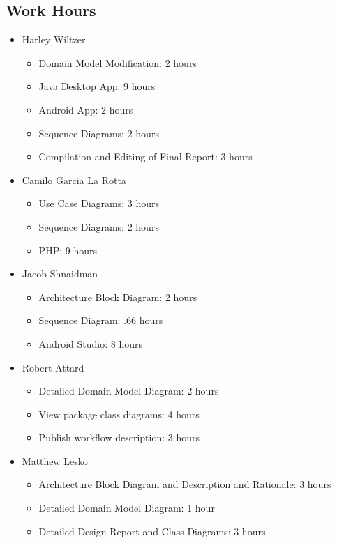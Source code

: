 \documentclass[12pt]{article}
\begin{document}
\subsection{Work Hours}

\begin{itemize}
    \item Harley Wiltzer
        \begin{itemize}
            \item Domain Model Modification: 2 hours
            \item Java Desktop App: 9 hours
            \item Android App: 2 hours
            \item Sequence Diagrams: 2 hours
            \item Compilation and Editing of Final Report: 3 hours
        \end{itemize}
    \item Camilo Garcia La Rotta
    \begin{itemize}
        \item Use Case Diagrams: 3 hours
        \item Sequence Diagrams: 2 hours
        \item PHP: 9 hours
    \end{itemize}
    \item Jacob Shnaidman
    \begin{itemize}
        \item Architecture Block Diagram: 2 hours
        \item Sequence Diagram: .66 hours
        \item Android Studio: 8 hours
    \end{itemize}
    \item Robert Attard
    \begin{itemize}
        \item Detailed Domain Model Diagram: 2 hours
        \item View package class diagrams: 4 hours
        \item Publish workflow description: 3 hours
    \end{itemize}
    \item Matthew Lesko
    \begin{itemize}
        \item Architecture Block Diagram and Description and Rationale: 3 hours
        \item Detailed Domain Model Diagram: 1 hour
        \item Detailed Design Report and Class Diagrams: 3 hours
    \end{itemize}
\end{itemize}
\end{document}
